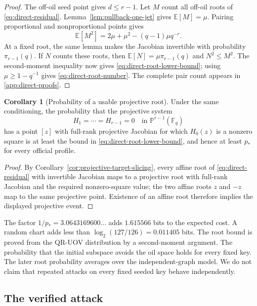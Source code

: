 \documentclass[11pt,a4paper]{article}
\theoremstyle{definition}
\newtheorem{corollary}[theorem]{Corollary}
\theoremstyle{remark}
\newcommand{\F}{\mathbb F}
\newcommand{\PP}{\mathbb P}
\begin{document}
\begin{proof}
The off-oil seed point gives $d\le r-1$.  Let $M$ count all off-oil roots of
\eqref{eq:direct-residual}.  Lemma~\ref{lem:pullback-one-jet} gives
$\mathbb E[M]=\mu$.  Pairing proportional and nonproportional points gives
\begin{equation}\label{eq:root-second-moment}
 \mathbb E[M^2]
 =2\mu+\mu^2-(q-1)\mu q^{-r}.
\end{equation}
At a fixed root, the same lemma makes the Jacobian invertible with probability
$\pi_{r-1}(q)$.  If $N$ counts these roots, then
$\mathbb E[N]=\mu\pi_{r-1}(q)$ and $N^2\le M^2$.  The second-moment inequality
now gives \eqref{eq:direct-root-lower-bound}; using
$\mu\ge1-q^{-1}$ gives \eqref{eq:direct-root-number}.  The complete pair count
appears in \cref{app:direct-proofs}.
\end{proof}

\begin{corollary}[Probability of a usable projective root]\label{cor:projective-root-probability}
Under the same conditioning, the probability that the projective system
\[
 H_1=\cdots=H_{r-1}=0\quad\text{in }\PP^{r-1}(\F_q)
\]
has a point $[z]$ with full-rank projective Jacobian for which $H_0(z)$ is a nonzero square is at
least the bound in \eqref{eq:direct-root-lower-bound}, and hence at least
$p_*$ for every official profile.
\end{corollary}

\begin{proof}
By Corollary~\ref{cor:projective-target-slicing}, every affine root of
\eqref{eq:direct-residual} with invertible Jacobian maps to a projective root
with full-rank Jacobian and the
required nonzero-square value;
the two affine roots $z$ and $-z$ map to the same projective point.  Existence
of an affine root therefore implies the displayed projective event.
\end{proof}

The factor $1/p_*=3.0643169600\ldots$ adds $1.615566$ bits to the expected
cost.  A random chart adds less than
$\log_2(127/126)=0.011405$ bits.  The root bound is proved from the QR-UOV
distribution by a second-moment argument.  The probability that the initial
subspace avoids the oil space holds for every fixed key.  The later root
probability averages over the independent-graph model.  We do not claim that
repeated attacks on every fixed seeded key behave independently.

\subsection{The verified attack}
\end{document}
